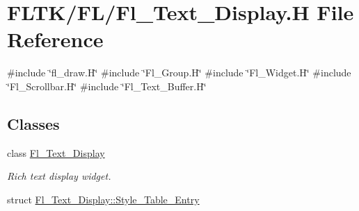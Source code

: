 \hypertarget{_fl___text___display_8_h}{}\section{F\+L\+T\+K/\+F\+L/\+Fl\+\_\+\+Text\+\_\+\+Display.H File Reference}
\label{_fl___text___display_8_h}
{\ttfamily \#include \char`\"{}fl\+\_\+draw.\+H\char`\"{}}\newline
{\ttfamily \#include \char`\"{}Fl\+\_\+\+Group.\+H\char`\"{}}\newline
{\ttfamily \#include \char`\"{}Fl\+\_\+\+Widget.\+H\char`\"{}}\newline
{\ttfamily \#include \char`\"{}Fl\+\_\+\+Scrollbar.\+H\char`\"{}}\newline
{\ttfamily \#include \char`\"{}Fl\+\_\+\+Text\+\_\+\+Buffer.\+H\char`\"{}}\newline
\subsection*{Classes}
\begin{DoxyCompactItemize}
\item 
class \hyperlink{class_fl___text___display}{Fl\+\_\+\+Text\+\_\+\+Display}
\begin{DoxyCompactList}\small\item\em Rich text display widget. \end{DoxyCompactList}\item 
struct \hyperlink{struct_fl___text___display_1_1_style___table___entry}{Fl\+\_\+\+Text\+\_\+\+Display\+::\+Style\+\_\+\+Table\+\_\+\+Entry}
\end{DoxyCompactItemize}
